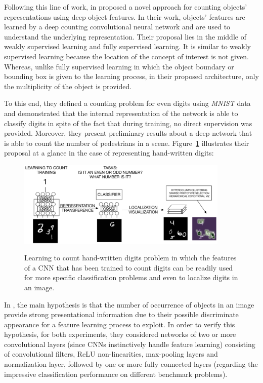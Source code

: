 Following this line of work,  in \cite{segui2015learning} proposed a novel approach for counting objects' representations using deep object features. In their work, objects' features are learned by a deep counting convolutional neural network and are used to understand the underlying representation. Their proposal lies in the middle of weakly supervised learning and fully supervised learning\cite{mohri2012foundations}. It is similar to weakly supervised learning because the location of the concept of interest is not given. Whereas, unlike fully supervised learning in which the object boundary or bounding box is given to the learning process, in their proposed architecture, only the multiplicity of the object is provided\cite{segui2015learning}.

To this end, they defined a counting problem for even digits using \textit{MNIST} data and demonstrated that the internal representation of the network is able to classify digits in spite of the fact that during training, no direct supervision was provided. Moreover, they present preliminary results about a deep network that is able to count the number of pedestrians in a scene\cite{segui2015learning}. Figure~\ref{fig:santimnist} illustrates their proposal at a glance in the case of representing hand-written digits:
\begin{figure}[H]
	\centering
	{\includegraphics[width=0.9\textwidth]{images/santimnist}}
	\caption{Learning to count hand-written digits problem in which the features of a CNN that has been trained to count digits can be readily used for more specific classification problems and even to localize digits in an image\cite{segui2015learning}.}
	\label{fig:santimnist}
\end{figure}

In \cite{segui2015learning}, the main hypothesis is that the number of occurrence of objects in an image provide strong presentational information due to their possible discriminate appearance for a feature learning process to exploit. In order to verify this hypothesis, for both experiments, they considered networks of two or more convolutional layers (since CNNs instinctively handle feature learning\cite{lecun1989backpropagation}) consisting of convolutional filters, ReLU non-linearities, max-pooling layers and normalization layer, followed by one or more fully connected layers (regarding the impressive classification performance on different benchmark problems\cite{krizhevsky2012imagenet, Karpathy_2014_CVPR, ciresan2011flexible})\cite{segui2015learning}. 

